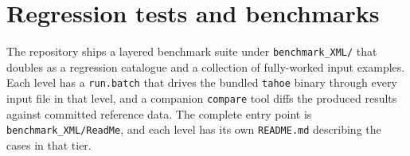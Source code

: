 
\section{Regression tests and benchmarks}
\label{sect.regression}
The repository ships a layered benchmark suite under
\texttt{benchmark\_XML/} that doubles as a regression catalogue and a
collection of fully-worked input examples.  Each level has a
\texttt{run.batch} that drives the bundled \texttt{tahoe} binary
through every input file in that level, and a companion
\texttt{compare} tool diffs the produced results against committed
reference data.  The complete entry point is \texttt{benchmark\_XML/ReadMe},
and each level has its own \texttt{README.md} describing the cases in
that tier.

